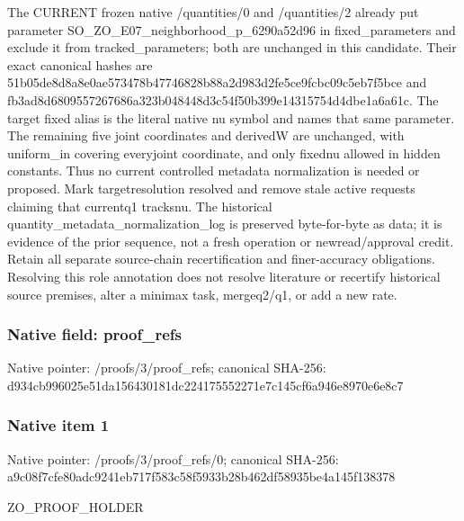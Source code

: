 \documentclass[10pt,a4paper]{article}
\begin{document}
\begingroup\raggedright\sloppy The CURRENT frozen native /\allowbreak{}quantities/\allowbreak{}0 and /\allowbreak{}quantities/\allowbreak{}2 already put parameter SO\_\allowbreak{}ZO\_\allowbreak{}E07\_\allowbreak{}neighborhood\_\allowbreak{}p\_\allowbreak{}6290a52d96 in fixed\_\allowbreak{}parameters and exclude it from tracked\_\allowbreak{}parameters;\allowbreak{} both are unchanged in this candidate. Their exact canonical hashes are 51b05de8d8a8e0ae573478b47746828b88a2d983d2fe5ce9fcbc09c5eb7f5bce and fb3ad8d6809557267686a323b048448d3c54f50b399e14315754d4dbe1a6a61c. The target fixed alias is the literal native nu symbol and names that same parameter. The remaining five joint coordinates and derivedW are unchanged,\allowbreak{} with uniform\_\allowbreak{}in covering everyjoint coordinate,\allowbreak{} and only fixednu allowed in hidden constants. Thus no current controlled metadata normalization is needed or proposed. Mark targetresolution resolved and remove stale active requests claiming that currentq1 tracksnu. The historical quantity\_\allowbreak{}metadata\_\allowbreak{}normalization\_\allowbreak{}log is preserved byte-for-byte as data;\allowbreak{} it is evidence of the prior sequence,\allowbreak{} not a fresh operation or newread/\allowbreak{}approval credit. Retain all separate source-chain recertification and finer-accuracy obligations. Resolving this role annotation does not resolve literature or recertify historical source premises,\allowbreak{} alter a minimax task,\allowbreak{} mergeq2/\allowbreak{}q1,\allowbreak{} or add a new rate.\par\endgroup

\subsubsection{Native field: proof\_\allowbreak{}refs}
Native pointer: /proofs/3/proof\_\allowbreak{}refs; canonical SHA-256: d934cb996025e51da156430181dc224175552271e7c145cf6a946e8970e6e8c7

\subsubsection{Native item 1}
Native pointer: /proofs/3/proof\_\allowbreak{}refs/0; canonical SHA-256: a9c08f7cfe80adc9241eb717f583c58f5933b28b462df58935be4a145f138378

\begingroup\raggedright\sloppy ZO\_\allowbreak{}PROOF\_\allowbreak{}HOLDER\par\endgroup
\end{document}
